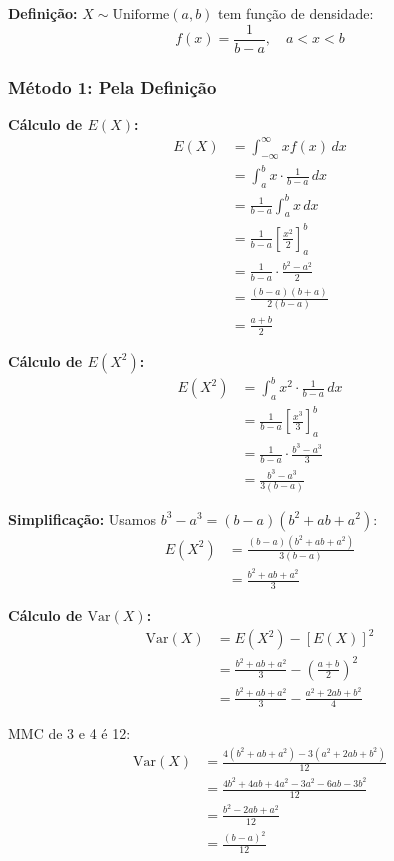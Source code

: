 \documentclass[12pt,a4paper]{article}
\theoremstyle{plain}
\theoremstyle{definition}
\theoremstyle{remark}
\begin{document}
\textbf{Definição:} \(X \sim \text{Uniforme}(a, b)\) tem função de densidade:
\[
f(x) = \frac{1}{b-a}, \quad a < x < b
\]

\subsubsection{Método 1: Pela Definição}

\textbf{Cálculo de \(E(X)\):}
\begin{align}
E(X) &= \int_{-\infty}^{\infty} x f(x) \, dx \\
&= \int_a^b x \cdot \frac{1}{b-a} \, dx \\
&= \frac{1}{b-a} \int_a^b x \, dx \\
&= \frac{1}{b-a} \left[ \frac{x^2}{2} \right]_a^b \\
&= \frac{1}{b-a} \cdot \frac{b^2 - a^2}{2} \\
&= \frac{(b-a)(b+a)}{2(b-a)} \\
&= \frac{a+b}{2}
\end{align}

\textbf{Cálculo de \(E(X^2)\):}
\begin{align}
E(X^2) &= \int_a^b x^2 \cdot \frac{1}{b-a} \, dx \\
&= \frac{1}{b-a} \left[ \frac{x^3}{3} \right]_a^b \\
&= \frac{1}{b-a} \cdot \frac{b^3 - a^3}{3} \\
&= \frac{b^3 - a^3}{3(b-a)}
\end{align}

\textbf{Simplificação:} Usamos \(b^3 - a^3 = (b-a)(b^2 + ab + a^2)\):
\begin{align}
E(X^2) &= \frac{(b-a)(b^2 + ab + a^2)}{3(b-a)} \\
&= \frac{b^2 + ab + a^2}{3}
\end{align}

\textbf{Cálculo de \(\text{Var}(X)\):}
\begin{align}
\text{Var}(X) &= E(X^2) - [E(X)]^2 \\
&= \frac{b^2 + ab + a^2}{3} - \left(\frac{a+b}{2}\right)^2 \\
&= \frac{b^2 + ab + a^2}{3} - \frac{a^2 + 2ab + b^2}{4}
\end{align}

MMC de 3 e 4 é 12:
\begin{align}
\text{Var}(X) &= \frac{4(b^2 + ab + a^2) - 3(a^2 + 2ab + b^2)}{12} \\
&= \frac{4b^2 + 4ab + 4a^2 - 3a^2 - 6ab - 3b^2}{12} \\
&= \frac{b^2 - 2ab + a^2}{12} \\
&= \frac{(b-a)^2}{12}
\end{align}
\end{document}
